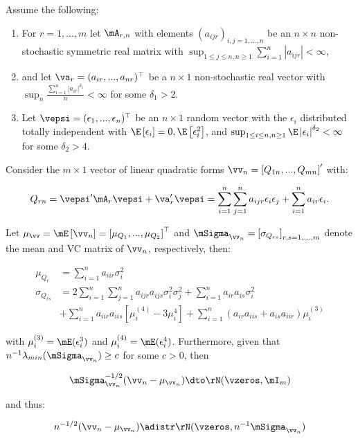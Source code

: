 \documentclass[english,12pt]{book}\usepackage[]{graphicx}\usepackage[]{xcolor}
\begin{document}
\begin{theorem}\label{teo:clt_quadratic}
		Assume the following:
		\begin{enumerate}
			\item For $r = 1,...,m$ let $\mA_{r,n}$ with elements $(a_{ijr})_{i,j = 1,...,n}$ be an $n\times n$ non-stochastic symmetric real matrix with $\sup_{1\leq j \leq n, n\geq 1}\sum_{i = 1}^n|a_{ijr}| < \infty$,
			\item and let $\va_r = (a_{ir},...,a_{nr})^\top$ be a $n \times 1$ non-stochastic real vector with $\sup_{n}\frac{\sum_{i=1}^n \left|a_{ir}\right|^{\delta_1}}{n}<\infty$ for some $\delta_1 > 2$.
			\item Let $\vepsi = (\epsilon_1,...,\epsilon_n)^\top$ be an $n \times 1$ random vector with the $\epsilon_i$ distributed totally independent with $\E\left[\epsilon_i\right] = 0, \E\left[\epsilon_i^2\right]$, and  $\sup_{1 \leq i \leq n, n \geq 1}\E\left|\epsilon_{i}\right|^{\delta_2}<\infty$ for some $\delta_2 >4$. 
		\end{enumerate}
		Consider the $m \times 1$ vector of linear quadratic forms $\vv_n = \left[Q_{1n},..., Q_{mn}\right]'$ with:
		
		\begin{equation}
			Q_{rn}= \vepsi'\mA_r\vepsi + \va_r'\vepsi = \sum_{i=1}^n\sum_{j=1}^na_{ijr}\epsilon_i\epsilon_j + \sum_{i=1}^na_{ir}\epsilon_i.
		\end{equation}
		
		Let $\mu_{\vv} = \mE\left[\vv_n\right] = \left[\mu_{Q_1},...,\mu_{Q_2}\right]^\top$ and $\mSigma_{\vv_n} =\left[\sigma_{Q_{rs}}\right]_{r,s =1,...,m}$ denote the mean and VC matrix of $\vv_n$, respectively, then:
		
		\begin{equation*}
			\begin{aligned}
			\mu_{Q_r} & = \sum_{i = 1}^na_{iir}\sigma_i^2 \\
			 \sigma_{Q_{rs}} & = 2\sum_{i=1}^n\sum_{j =1}^na_{ijr}a_{ijs}\sigma^2_i\sigma_j^2 + \sum_{i = 1}^na_{ir}a_{is}\sigma_i^2 \\
			 	            & + \sum_{i = 1}^na_{iir}a_{iis}\left[\mu_i^{(4)} - 3\mu_i^{4}\right] + \sum_{i =1}^n(a_{ir}a_{iis} + a_{is}a_{iir})\mu_i^{(3)}
			\end{aligned}
		\end{equation*}
		
		with $\mu_i^{(3)} = \mE(\epsilon_i^3)$ and $\mu_i^{(4)} = \mE(\epsilon_i^4)$. Furthermore, given that $n^{-1}\lambda_{min}(\mSigma_{\vv_n})\geq c$ for some $c > 0$, then
		
		\begin{equation*}
		\mSigma_{\vv_n} ^{-1/2}(\vv_n - \mu_{\vv_n})\dto \rN(\vzeros, \mI_m)
		\end{equation*}
		
		and thus:
		
		\begin{equation*}
			n^{-1/2}(\vv_n - \mu_{\vv_n}) \adistr \rN(\vzeros, n^{-1}\mSigma_{\vv_n})
		\end{equation*}
\end{theorem}	
\end{document}
